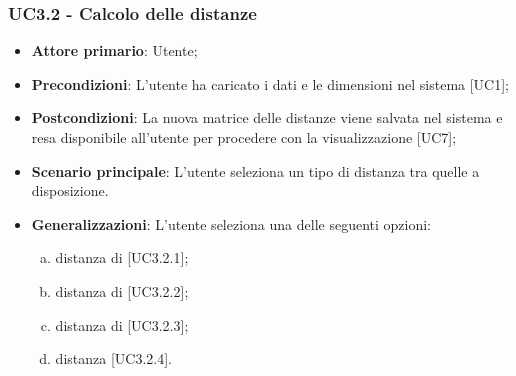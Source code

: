 \subsubsection{UC3.2 - Calcolo delle distanze}
\begin{itemize}
	\item \textbf{Attore primario}: Utente;
	\item \textbf{Precondizioni}: L'utente ha caricato i dati e le dimensioni nel sistema [UC1];
	\item \textbf{Postcondizioni}: La nuova matrice delle distanze viene salvata nel sistema e resa disponibile all'utente per procedere con la visualizzazione [UC7];

	\item \textbf{Scenario principale}: L'utente seleziona un tipo di distanza tra quelle a disposizione.
	
	\item \textbf{Generalizzazioni}: L'utente seleziona una delle seguenti opzioni:
	
	\begin{enumerate}[(a)]
		\item distanza di  [UC3.2.1];
		\item distanza di  [UC3.2.2];
		\item distanza di  [UC3.2.3];
		\item distanza  [UC3.2.4].
	\end{enumerate}
\end{itemize}